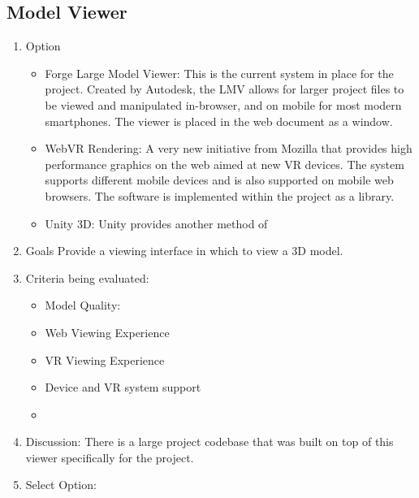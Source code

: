 \documentclass[letterpaper, 10pt, draftclsnofoot, compsoc, onecolumn]{IEEEtran}
\begin{document}
	\subsection{Model Viewer}
		\begin{enumerate}
			\item{Option}
				\begin{itemize}
					\item{Forge Large Model Viewer: This is the current system in place for the project. Created by Autodesk, the LMV allows for larger project files to be viewed and manipulated in-browser, and on mobile for most modern smartphones. The viewer is placed in the web document as a window.}
					\item{WebVR Rendering: A very new initiative from Mozilla that provides high performance graphics on the web aimed at new VR devices. The system supports different mobile devices and is also supported on mobile web browsers. The software is implemented within the project as a library.}
					\item{Unity 3D: Unity provides another method of }
		
				\end{itemize}
			\item{Goals}
			Provide a viewing interface in which to view a 3D model.
			
			\item{Criteria being evaluated:}
			
			\begin{itemize}
					\item{Model Quality:}
					\item{Web Viewing Experience}
					\item{VR Viewing Experience}
					\item{Device and VR system support}
					\item
			\end{itemize}
			
			\item{Discussion:}
			There is a large project codebase that was built on top of this viewer specifically for the project.
			\item{Select Option:}
	\end{enumerate}
		
\end{document}
